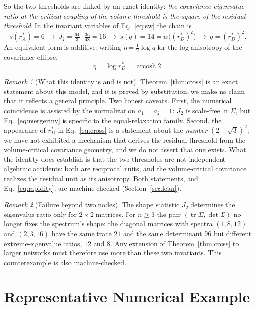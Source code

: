 \documentclass[11pt]{article}
\theoremstyle{plain}
\theoremstyle{remark}
\newtheorem{remark}{Remark}
\newcommand{\tr}{\operatorname{tr}}
\newcommand{\rA}{r_A^{*}}
\newcommand{\rD}{r_D^{*}}
\begin{document}
So the two thresholds are linked by an exact identity: \emph{the covariance eigenvalue ratio at
the critical coupling of the volume threshold is the square of the residual threshold}. In the
invariant variables of Eq.~\eqref{eq:sw} the chain is
\[
  s(\rA)=6
  \ \longrightarrow\
  J_2=\tfrac{64}{3}\cdot\tfrac{36}{48}=16
  \ \longrightarrow\
  s(q)=14=w\bigl((\rD)^2\bigr)
  \ \longrightarrow\
  q=(\rD)^2 .
\]
An equivalent form is additive: writing $\eta=\tfrac12\log q$ for the log-anisotropy of the
covariance ellipse,
\begin{equation}
  \eta=\log\rD=\operatorname{arcosh}2 . \label{eq:rapidity}
\end{equation}

\begin{remark}[What this identity is and is not]
Theorem~\ref{thm:cross} is an exact statement about this model, and it is proved by
substitution; we make no claim that it reflects a general principle. Two honest caveats. First,
the numerical coincidence is assisted by the normalization $a_1=a_2=1$: $J_2$ is scale-free in
$\Sigma$, but Eq.~\eqref{eq:mergerinv} is specific to the equal-relaxation family. Second, the
appearance of $\rD$ in Eq.~\eqref{eq:cross} is a statement about the \emph{number}
$(2+\sqrt3)^2$; we have not exhibited a mechanism that derives the residual threshold from the
volume-critical covariance geometry, and we do not assert that one exists. What the identity
does establish is that the two thresholds are not independent algebraic accidents: both are
reciprocal units, and the volume-critical covariance realizes the residual unit as its
anisotropy. Both statements, and Eq.~\eqref{eq:rapidity}, are machine-checked
(Section~\ref{sec:lean}).
\end{remark}

\begin{remark}[Failure beyond two nodes]
The shape statistic $J_2$ determines the eigenvalue ratio only for $2\times2$ matrices. For
$n\ge3$ the pair $(\tr\Sigma,\det\Sigma)$ no longer fixes the spectrum's shape: the diagonal
matrices with spectra $(1,8,12)$ and $(2,3,16)$ have the same trace $21$ and the same
determinant $96$ but different extreme-eigenvalue ratios, $12$ and $8$. Any extension of
Theorem~\ref{thm:cross} to larger networks must therefore use more than these two invariants.
This counterexample is also machine-checked.
\end{remark}

\section{Representative Numerical Example}
\end{document}
